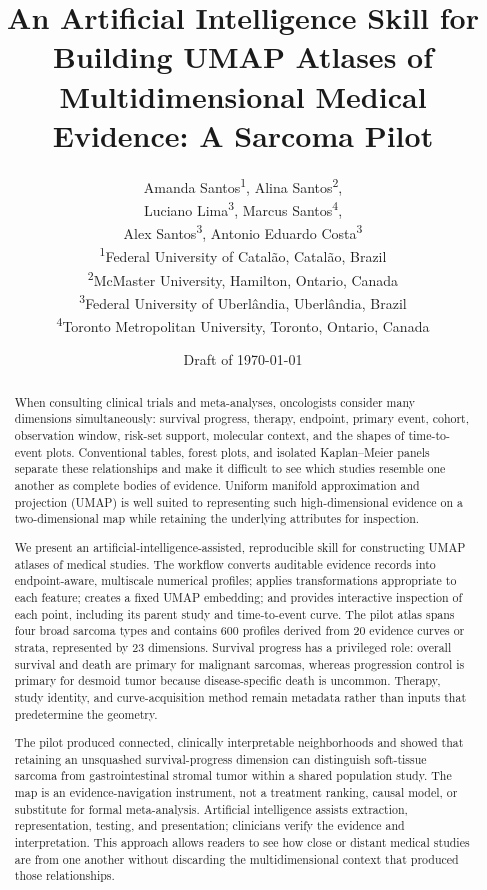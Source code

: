 \documentclass[17pt]{extarticle}
\title{An Artificial Intelligence Skill for Building UMAP Atlases of Multidimensional Medical Evidence: A Sarcoma Pilot}
\author{%
Amanda Santos\textsuperscript{1}, Alina Santos\textsuperscript{2},\\
Luciano Lima\textsuperscript{3}, Marcus Santos\textsuperscript{4},\\
Alex Santos\textsuperscript{3}, Antonio Eduardo Costa\textsuperscript{3}\\[0.75em]
\small \textsuperscript{1}Federal University of Catalão, Catalão, Brazil\\
\small \textsuperscript{2}McMaster University, Hamilton, Ontario, Canada\\
\small \textsuperscript{3}Federal University of Uberlândia, Uberlândia, Brazil\\
\small \textsuperscript{4}Toronto Metropolitan University, Toronto, Ontario, Canada
}
\date{Draft of \today}
\begin{document}
\maketitle

\begin{abstract}
When consulting clinical trials and meta-analyses, oncologists consider many dimensions simultaneously: survival progress, therapy, endpoint, primary event, cohort, observation window, risk-set support, molecular context, and the shapes of time-to-event plots. Conventional tables, forest plots, and isolated Kaplan--Meier panels separate these relationships and make it difficult to see which studies resemble one another as complete bodies of evidence. Uniform manifold approximation and projection (UMAP) is well suited to representing such high-dimensional evidence on a two-dimensional map while retaining the underlying attributes for inspection.

We present an artificial-intelligence-assisted, reproducible skill for constructing UMAP atlases of medical studies. The workflow converts auditable evidence records into endpoint-aware, multiscale numerical profiles; applies transformations appropriate to each feature; creates a fixed UMAP embedding; and provides interactive inspection of each point, including its parent study and time-to-event curve. The pilot atlas spans four broad sarcoma types and contains 600 profiles derived from 20 evidence curves or strata, represented by 23 dimensions. Survival progress has a privileged role: overall survival and death are primary for malignant sarcomas, whereas progression control is primary for desmoid tumor because disease-specific death is uncommon. Therapy, study identity, and curve-acquisition method remain metadata rather than inputs that predetermine the geometry.

The pilot produced connected, clinically interpretable neighborhoods and showed that retaining an unsquashed survival-progress dimension can distinguish soft-tissue sarcoma from gastrointestinal stromal tumor within a shared population study. The map is an evidence-navigation instrument, not a treatment ranking, causal model, or substitute for formal meta-analysis. Artificial intelligence assists extraction, representation, testing, and presentation; clinicians verify the evidence and interpretation. This approach allows readers to see how close or distant medical studies are from one another without discarding the multidimensional context that produced those relationships.
\end{abstract}
\end{document}
